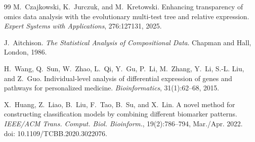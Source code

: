\documentclass[journal]{IEEEtran}
\begin{document}
\begin{thebibliography}{99}
M.~Czajkowski, K.~Jurczuk, and M.~Kretowski.
\newblock Enhancing transparency of omics data analysis with the evolutionary multi-test tree and relative expression.
\newblock \emph{Expert Systems with Applications}, 276:127131, 2025.

J.~Aitchison.
\newblock \emph{The Statistical Analysis of Compositional Data}.
\newblock Chapman and Hall, London, 1986.

H.~Wang, Q.~Sun, W.~Zhao, L.~Qi, Y.~Gu, P.~Li, M.~Zhang, Y.~Li, S.-L. Liu, and Z.~Guo.
\newblock Individual-level analysis of differential expression of genes and pathways for personalized medicine.
\newblock \emph{Bioinformatics}, 31(1):62--68, 2015.

X.~Huang, Z.~Liao, B.~Liu, F.~Tao, B.~Su, and X.~Lin.
\newblock A novel method for constructing classification models by combining different biomarker patterns.
\newblock \emph{IEEE/ACM Trans. Comput. Biol. Bioinform.}, 19(2):786--794, Mar./Apr. 2022.
\newblock doi: 10.1109/TCBB.2020.3022076.
\end{thebibliography}
\end{document}
